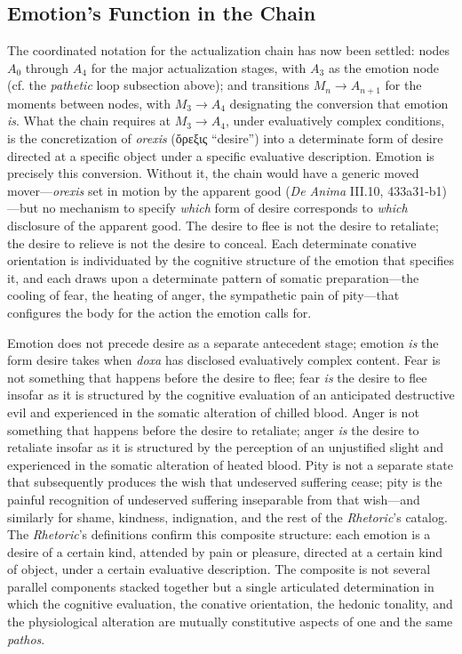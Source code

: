 \documentclass{article}
\newcommand{\gk}[1]{{\greekfont #1}}
\begin{document}
\subsection{Emotion's Function in the Chain}

The coordinated notation for the actualization chain has now been settled: nodes $A_0$ through $A_4$ for the major actualization stages, with $A_3$ as the emotion node (cf. the \textit{pathetic} loop subsection above); and transitions $M_n \rightarrow A_{n+1}$ for the moments between nodes, with $M_3 \rightarrow A_4$ designating the conversion that emotion \textit{is}. What the chain requires at $M_3 \rightarrow A_4$, under evaluatively complex conditions, is the concretization of \textit{orexis} (\gk{ὄρεξις} ``desire'') into a determinate form of desire directed at a specific object under a specific evaluative description. Emotion is precisely this conversion. Without it, the chain would have a generic moved mover---\textit{orexis} set in motion by the apparent good (\textit{De Anima} III.10, 433a31-b1)---but no mechanism to specify \textit{which} form of desire corresponds to \textit{which} disclosure of the apparent good. The desire to flee is not the desire to retaliate; the desire to relieve is not the desire to conceal. Each determinate conative orientation is individuated by the cognitive structure of the emotion that specifies it, and each draws upon a determinate pattern of somatic preparation---the cooling of fear, the heating of anger, the sympathetic pain of pity---that configures the body for the action the emotion calls for.

Emotion does not precede desire as a separate antecedent stage; emotion \textit{is} the form desire takes when \textit{doxa} has disclosed evaluatively complex content. Fear is not something that happens before the desire to flee; fear \textit{is} the desire to flee insofar as it is structured by the cognitive evaluation of an anticipated destructive evil and experienced in the somatic alteration of chilled blood. Anger is not something that happens before the desire to retaliate; anger \textit{is} the desire to retaliate insofar as it is structured by the perception of an unjustified slight and experienced in the somatic alteration of heated blood. Pity is not a separate state that subsequently produces the wish that undeserved suffering cease; pity is the painful recognition of undeserved suffering inseparable from that wish---and similarly for shame, kindness, indignation, and the rest of the \textit{Rhetoric}'s catalog. The \textit{Rhetoric}'s definitions confirm this composite structure: each emotion is a desire of a certain kind, attended by pain or pleasure, directed at a certain kind of object, under a certain evaluative description. The composite is not several parallel components stacked together but a single articulated determination in which the cognitive evaluation, the conative orientation, the hedonic tonality, and the physiological alteration are mutually constitutive aspects of one and the same \textit{pathos}. 
\end{document}
